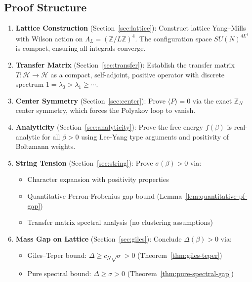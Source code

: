 \subsection{Proof Structure}

\begin{enumerate}[label=\textbf{Step \arabic*:}]
\item \textbf{Lattice Construction} (Section~\ref{sec:lattice}): 
Construct lattice Yang--Mills with Wilson action on $\Lambda_L = (\mathbb{Z}/L\mathbb{Z})^4$. 
The configuration space $SU(N)^{4L^4}$ is compact, ensuring all integrals converge.

\item \textbf{Transfer Matrix} (Section~\ref{sec:transfer}): 
Establish the transfer matrix $T: \mathcal{H} \to \mathcal{H}$ as a compact, 
self-adjoint, positive operator with discrete spectrum $1 = \lambda_0 > \lambda_1 \geq \cdots$.

\item \textbf{Center Symmetry} (Section~\ref{sec:center}): 
Prove $\langle P \rangle = 0$ via the exact $\mathbb{Z}_N$ center symmetry, 
which forces the Polyakov loop to vanish.

\item \textbf{Analyticity} (Section~\ref{sec:analyticity}): 
Prove the free energy $f(\beta)$ is real-analytic for all $\beta > 0$ using 
Lee-Yang type arguments and positivity of Boltzmann weights.

\item \textbf{String Tension} (Section~\ref{sec:string}): 
Prove $\sigma(\beta) > 0$ via:
\begin{itemize}
\item Character expansion with positivity properties
\item Quantitative Perron-Frobenius gap bound (Lemma~\ref{lem:quantitative-pf-gap})
\item Transfer matrix spectral analysis (no clustering assumptions)
\end{itemize}

\item \textbf{Mass Gap on Lattice} (Section~\ref{sec:giles}): 
Conclude $\Delta(\beta) > 0$ via:
\begin{itemize}
\item Giles--Teper bound: $\Delta \geq c_N\sqrt{\sigma} > 0$ (Theorem~\ref{thm:giles-teper})
\item Pure spectral bound: $\Delta \geq \sigma > 0$ (Theorem~\ref{thm:pure-spectral-gap})
\end{itemize}


\end{enumerate}
